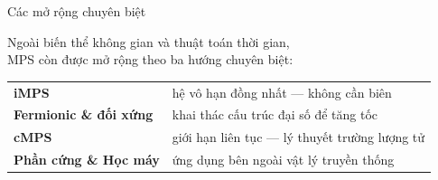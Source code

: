 \documentclass[aspectratio=169, 11pt]{beamer}
\begin{document}
\begin{frame}{Các mở rộng chuyên biệt}

\vspace{14pt}
\begin{center}
{\large Ngoài biến thể không gian và thuật toán thời gian,\\[6pt]
MPS còn được mở rộng theo ba hướng chuyên biệt:}
\end{center}

\vspace{14pt}
{\small
\begin{tabular}{@{}l@{\quad}l@{}}
\textcolor{qamber}{\textbf{iMPS}} & hệ vô hạn đồng nhất — không cần biên \\[4pt]
\textcolor{qamber}{\textbf{Fermionic \& đối xứng}} & khai thác cấu trúc đại số để tăng tốc \\[4pt]
\textcolor{qamber}{\textbf{cMPS}} & giới hạn liên tục — lý thuyết trường lượng tử \\[4pt]
\textcolor{qamber}{\textbf{Phần cứng \& Học máy}} & ứng dụng bên ngoài vật lý truyền thống \\
\end{tabular}}

\end{frame}
\end{document}
